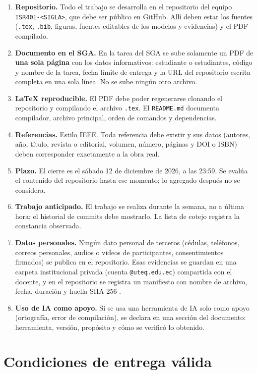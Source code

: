 \documentclass[11pt]{article}
\newcommand{\seccion}[1]{\section{\textcolor{utegreendk}{#1}}}
\begin{document}
\begin{enumerate}[leftmargin=20pt,itemsep=3pt]
	\item \textbf{Repositorio.} Todo el trabajo se desarrolla en el repositorio del equipo \texttt{ISR401-<SIGLA>}, que debe ser público en GitHub. Allí deben estar los fuentes (\texttt{.tex}, \texttt{.bib}, figuras, fuentes editables de los modelos y evidencias) y el PDF compilado.
	\item \textbf{Documento en el SGA.} En la tarea del SGA se sube solamente un PDF de \textbf{una sola página} con los datos informativos: estudiante o estudiantes, código y nombre de la tarea, fecha límite de entrega y la URL del repositorio escrita completa en una sola línea. No se sube ningún otro archivo.
	\item \textbf{\LaTeX{} reproducible.} El PDF debe poder regenerarse clonando el repositorio y compilando el archivo \texttt{.tex}. El \texttt{README.md} documenta compilador, archivo principal, orden de comandos y dependencias.
	\item \textbf{Referencias.} Estilo IEEE. Toda referencia debe existir y sus datos (autores, año, título, revista o editorial, volumen, número, páginas y DOI o ISBN) deben corresponder exactamente a la obra real.
	\item \textbf{Plazo.} El cierre es el sábado 12 de diciembre de 2026, a las 23:59. Se evalúa el contenido del repositorio hasta ese momento; lo agregado después no se considera.
	\item \textbf{Trabajo anticipado.} El trabajo se realiza durante la semana, no a última hora; el historial de commits debe mostrarlo. La lista de cotejo registra la constancia observada.
	\item \textbf{Datos personales.} Ningún dato personal de terceros (cédulas, teléfonos, correos personales, audios o videos de participantes, consentimientos firmados) se publica en el repositorio. Esas evidencias se guardan en una carpeta institucional privada (cuenta \texttt{@uteq.edu.ec}) compartida con el docente, y en el repositorio se registra un manifiesto con nombre de archivo, fecha, duración y huella SHA-256 \citep{lopdp_2021}.
	\item \textbf{Uso de IA como apoyo.} Si se usa una herramienta de IA solo como apoyo (ortografía, error de compilación), se declara en una sección del documento: herramienta, versión, propósito y cómo se verificó lo obtenido.
\end{enumerate}

\seccion{Condiciones de entrega válida}
\end{document}
